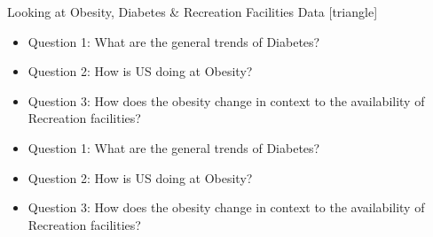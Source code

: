 \documentclass{beamer} %
\begin{document}
\begin{frame}{Looking at Obesity, Diabetes & Recreation Facilities Data}
  [triangle]

    \begin{itemize}
      \item Question 1: What are the general trends of Diabetes?
      \item Question 2: How is US doing at Obesity?
      \item Question 3: How does the obesity change in context to the availability of Recreation facilities?
    \end{itemize}

   \begin{itemize}
     \item Question 1: What are the general trends of Diabetes?
     \item Question 2: How is US doing at Obesity?
     \item Question 3: How does the obesity change in context to the availability of Recreation facilities?
   \end{itemize}

\end{frame}
\end{document}
